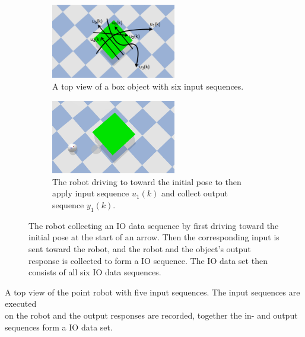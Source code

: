 \begin{figure}[H]\ContinuedFloat
    \centering
    \begin{subfigure}{\textwidth}
    \centering
    \includegraphics[width=0.6\textwidth]{figures/required_background/collect_io_data_object}
    \caption{A top view of a box object with six input sequences.}%
    \label{subfig:collect_io_object_arrows}
    \end{subfigure}

    \begin{subfigure}{\textwidth}
    \centering
    \includegraphics[width=0.6\textwidth]{figures/required_background/collect_io_data_obj_and_robot}
    \caption{The robot driving to toward the initial pose to then apply input sequence $u_1(k)$ and collect output sequence $y_1(k)$.}%
    \label{subfig:collect_io_object_goto_init}
    \end{subfigure}
    \caption{The robot collecting an \ac{IO} data sequence by first driving toward the initial pose at the start of an arrow. Then the corresponding input is sent toward the robot, and the robot and the object's output response is collected to form a \ac{IO} sequence. The \ac{IO} data set then consists of all six \ac{IO} data sequences.}%
    \label{fig:collect_io_object}
\end{figure}

A top view of the point robot with five input sequences. The input sequences are executed\\on the robot and the output responses are recorded, together the in- and output sequences form a \ac{IO} data set.

